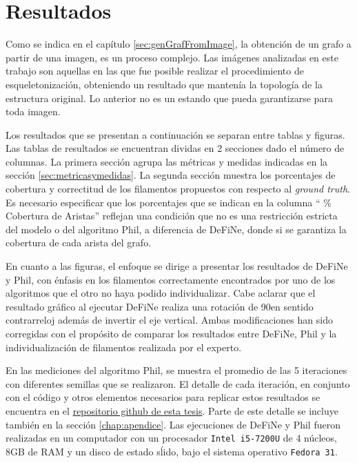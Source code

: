 \chapter{Resultados}
\label{chap:res}

Como se indica en el cap\'itulo \ref{sec:genGrafFromImage}, la obtenci\'on de un grafo a partir de una imagen, es un proceso complejo. Las im\'agenes analizadas en este trabajo son aquellas en las que fue posible realizar el procedimiento de esqueletonizaci\'on, obteniendo un resultado que manten\'ia la topolog\'ia de la estructura original. Lo anterior no es un estando que pueda garantizarse para toda imagen. 


Los resultados que se presentan a continuaci\'on se separan entre tablas y figuras. Las tablas de resultados se encuentran dividas en 2 secciones dado el n\'umero de columnas. La primera secci\'on agrupa las m\'etricas y medidas indicadas en la secci\'on \ref{sec:metricasymedidas}. La segunda secci\'on muestra los porcentajes de cobertura y correctitud de los filamentos propuestos con respecto al {\it ground truth}.
Es necesario especificar que los porcentajes que se indican en la columna `` \% Cobertura de Aristas'' reflejan una condici\'on que no es una restricci\'on estricta del modelo o del algoritmo Phil, a diferencia de DeFiNe, donde si se garantiza la cobertura de cada arista del grafo.


En cuanto a las figuras, el enfoque se dirige a presentar los resultados de DeFiNe y Phil, con \'enfasis en los filamentos correctamente encontrados por uno de los algoritmos que el otro no haya podido individualizar. Cabe aclarar que el resultado gr\'afico al ejecutar DeFiNe realiza una rotaci\'on de 90\textdegree en sentido contrarreloj adem\'as de invertir el eje vertical. Ambas modificaciones han sido corregidas con el prop\'osito de comparar los resultados entre DeFiNe, Phil y la individualizaci\'on de filamentos realizada por el experto.


En las mediciones del algoritmo Phil, se muestra el promedio de las 5 iteraciones con diferentes semillas que se realizaron. El detalle de cada iteraci\'on, en conjunto con el c\'odigo y otros elementos necesarios para replicar estos resultados se encuentra en el \href{https://gitlab.com/LeoXDXp/graph-crawler}{repositorio github de esta tesis}. Parte de este detalle se incluye tambi\'en en la secci\'on \ref{chap:apendice}.
Las ejecuciones de DeFiNe y Phil fueron realizadas en un computador con un procesador {\tt Intel i5-7200U} de 4 n\'ucleos, 8GB de RAM y un disco de estado s\'lido, bajo el sistema operativo {\tt Fedora 31}.

